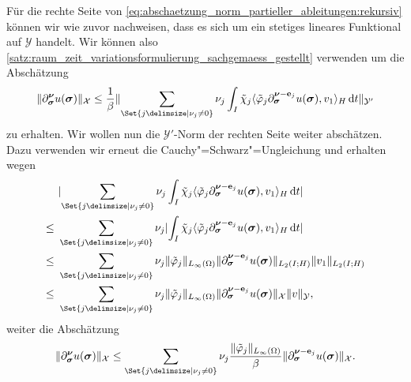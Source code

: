 \documentclass[../main.tex]{subfiles}
\begin{document}
\begin{Satz}
\begin{Beweis}
        Für die rechte Seite von \cref{eq:abschaetzung_norm_partieller_ableitungen:rekursiv} können wir wie zuvor nachweisen, dass es sich um ein stetiges lineares Funktional auf $\mathcal Y$ handelt.
        Wir können also \cref{satz:raum_zeit_variationsformulierung_sachgemaess_gestellt} verwenden um die Abschätzung
        \begin{equation}
            \norm{\partial^{\bm\nu}_{\bm\sigma} u(\bm\sigma)}_{\mathcal X} \leq \frac{1}{\beta} \norm{\sum_{\Set{j \given \nu_{j} \neq 0}} \nu_{j} \int_{I} \tilde{\chi}_{j} \skp{\tilde{\varphi}_{j} \partial^{\bm\nu - \vec e_{j}}_{\bm\sigma} u(\bm\sigma)}{v_{1}}{H} \diff t}_{\mathcal Y'}
        \end{equation}
        zu erhalten.
        Wir wollen nun die $\mathcal Y'$-Norm der rechten Seite weiter abschätzen.
        Dazu verwenden wir erneut die Cauchy"=Schwarz"=Ungleichung und erhalten wegen
        \begin{align}
            &\abs{\sum_{\Set{j \given \nu_{j} \neq 0}} \nu_{j} \int_{I} \tilde{\chi}_{j} \skp{\tilde{\varphi}_{j} \partial^{\bm\nu - \vec e_{j}}_{\bm\sigma} u(\bm\sigma)}{v_{1}}{H} \diff t}
            \\\leq~
            &\sum_{\Set{j \given \nu_{j} \neq 0}} \nu_{j} \abs {\int_{I} \tilde{\chi}_{j} \skp{\tilde{\varphi}_{j} \partial^{\bm\nu - \vec e_{j}}_{\bm\sigma} u(\bm\sigma)}{v_{1}}{H} \diff t}
            \\\leq~
            &\sum_{\Set{j \given \nu_{j} \neq 0}} \nu_{j} \norm{\tilde{\varphi}_{j}}_{L_{\infty}(\Omega)} \norm{\partial^{\bm\nu - \vec e_{j}}_{\bm\sigma} u(\bm\sigma)}_{L_{2}(I; H)} \norm{v_{1}}_{L_{2}(I; H)}
            \\\leq~
            &\sum_{\Set{j \given \nu_{j} \neq 0}} \nu_{j} \norm{\tilde{\varphi}_{j}}_{L_{\infty}(\Omega)} \norm{\partial^{\bm\nu - \vec e_{j}}_{\bm\sigma} u(\bm\sigma)}_{\mathcal X} \norm{v}_{\mathcal Y},
        \end{align}
        weiter die Abschätzung
        \begin{equation}
            \label{eq:abschaetzung_norm_partieller_ableitungen:rekursive_schranke}
            \norm{\partial^{\bm\nu}_{\bm\sigma} u(\bm\sigma)}_{\mathcal X} \leq \sum_{\Set{j \given \nu_{j} \neq 0}} \nu_{j} \frac{\norm{\tilde{\varphi}_{j}}_{L_{\infty}(\Omega)}}{\beta} \norm{\partial^{\bm\nu - \vec e_{j}}_{\bm\sigma} u(\bm\sigma)}_{\mathcal X}.
        \end{equation}


\end{Beweis}
\end{Satz}
\end{document}
